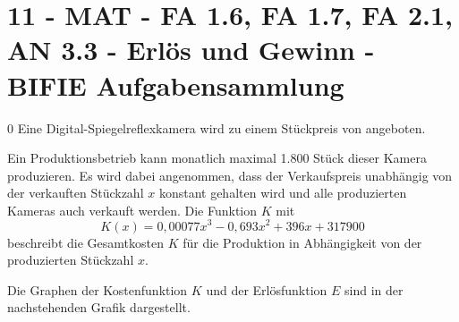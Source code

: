 \section{11 - MAT - FA 1.6, FA 1.7, FA 2.1, AN 3.3 - Erlös und Gewinn - BIFIE Aufgabensammlung}

\begin{langesbeispiel} \item[0] %
Eine Digital-Spiegelreflexkamera wird zu einem Stückpreis von  angeboten.
				
				Ein Produktionsbetrieb kann monatlich maximal 1.800 Stück dieser Kamera produzieren. Es wird dabei angenommen, dass der Verkaufspreis unabhängig von der verkauften Stückzahl $x$ konstant gehalten wird und alle produzierten Kameras auch verkauft werden. Die Funktion $K$ mit $$K(x)=0,00077x^3-0,693x^2+396x+317900$$ beschreibt die Gesamtkosten $K$ für die Produktion in Abhängigkeit von der produzierten Stückzahl $x$.
				
				Die Graphen der Kostenfunktion $K$ und der Erlösfunktion $E$ sind in der nachstehenden Grafik dargestellt.\vspace{0,3cm}
				

\end{langesbeispiel}
